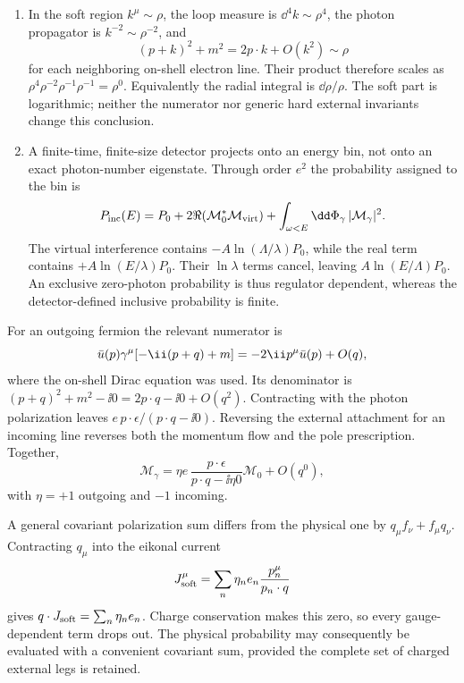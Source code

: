 
\begin{enumerate}
\begin{enumerate}
\item
In the soft region \(k^\mu\sim\rho\), the loop measure is \(\dd^4k\sim
\rho^4\), the photon propagator is \(k^{-2}\sim\rho^{-2}\), and
\[
 (p+k)^2+m^2=2p\cdot k+O(k^2)\sim\rho
\]
for each neighboring on-shell electron line.  Their product therefore
scales as \(\rho^4\rho^{-2}\rho^{-1}\rho^{-1}=\rho^0\).  Equivalently the
radial integral is \(\dd\rho/\rho\).  The soft part is logarithmic; neither
the numerator nor generic hard external invariants change this conclusion.
\item
A finite-time, finite-size detector projects onto an energy bin, not onto
an exact photon-number eigenstate.  Through order \(e^2\) the probability
assigned to the bin is
\[
 P_{\rm inc}(E)=P_0+2\Re(\mathcal M_0^*\mathcal M_{\rm virt})
 +\int_{\omega<E}\dd\Phi_\gamma\,|\mathcal M_\gamma|^2.
\]
The virtual interference contains \(-A\ln(\Lambda/\lambda)P_0\), while the
real term contains \(+A\ln(E/\lambda)P_0\).  Their \(\ln\lambda\) terms
cancel, leaving \(A\ln(E/\Lambda)P_0\).  An exclusive zero-photon
probability is thus regulator dependent, whereas the detector-defined
inclusive probability is finite.
\end{enumerate}

For an outgoing fermion the relevant numerator is
\[
 \bar u(p)\gamma^\mu[-\ii(\sl p+\sl q)+m]
 =-2\ii p^\mu\bar u(p)+O(q),
\]
where the on-shell Dirac equation was used.  Its denominator is
\((p+q)^2+m^2-\ii0=2p\cdot q-\ii0+O(q^2)\).  Contracting with the photon
polarization leaves \(e\,p\cdot\epsilon/(p\cdot q-\ii0)\).  Reversing the
external attachment for an incoming line reverses both the momentum flow
and the pole prescription.  Together,
\[
 \mathcal M_\gamma=
 \eta e\,\frac{p\cdot\epsilon}{p\cdot q-\ii\eta0}\mathcal M_0+O(q^0),
\]
with \(\eta=+1\) outgoing and \(-1\) incoming.

A general covariant polarization sum differs from the physical one by
\(q_\mu f_\nu+f_\mu q_\nu\).  Contracting \(q_\mu\) into the eikonal current
\[
 J^\mu_{\rm soft}=\sum_n\eta_ne_n\frac{p_n^\mu}{p_n\cdot q}
\]
gives \(q\cdot J_{\rm soft}=\sum_n\eta_ne_n\).  Charge conservation makes
this zero, so every gauge-dependent term drops out.  The physical
probability may consequently be evaluated with a convenient covariant
sum, provided the complete set of charged external legs is retained.


\end{enumerate}
